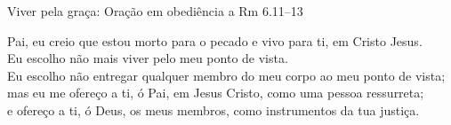 \documentclass[12pt,aspectratio=169]{beamer}
\newcommand{\QUOTE}[1]{%
    \par\noindent\hspace*{0.05\linewidth}%
    \begin{minipage}{0.9\linewidth}%
        \linespread{1.35}\large{#1}%
    \end{minipage}%
}
\newcommand{\RED}[1]{{\textcolor{TXred}{#1}}}
\newcommand{\YEL}[1]{{\textcolor{TXyel}{#1}}}
\newcommand{\MAG}[1]{{\textcolor{TXmag}{#1}}}
\newcommand{\BRI}[1]{{\textcolor{BSpbg}{#1}}}   %
\begin{document}
    \begin{frame}{\YEL{Viver pela graça}: \BRI{Oração em obediência} a Rm 6.11--13}
        \QUOTE{\normalsize
            Pai, eu \YEL{creio} que estou morto para o \RED{pecado} e vivo para ti, \MAG{em Cristo Jesus}.
            \\[\medskipamount]
            Eu \YEL{escolho} não mais viver pelo \RED{meu ponto de vista}.
            \\[\medskipamount]
            Eu \YEL{escolho} não entregar qualquer membro do meu corpo ao \RED{meu ponto de vista};
            \\[\medskipamount]
            mas eu me \YEL{ofereço} a ti, ó Pai, \MAG{em Jesus Cristo}, como uma pessoa ressurreta;
            \\[\medskipamount]
            e \YEL{ofereço} a ti, ó Deus, os meus membros, como instrumentos da tua justiça.
        }
    \end{frame}

\end{document}
